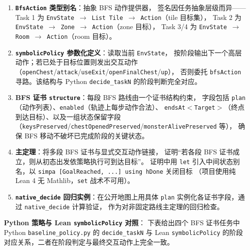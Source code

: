 \documentclass[12pt,a4paper]{ctexart}
\begin{document}
\begin{enumerate}[leftmargin=2em]
  \item \textbf{\texttt{BfsAction} 类型别名}：抽象 BFS 动作提供器，
  签名因任务抽象层级而异——
  Task 1 为 \texttt{EnvState $\to$ List Tile $\to$ Action}（tile 目标集），
  Task 2 为 \texttt{EnvState $\to$ Zone $\to$ Action}（zone 目标），
  Task 3/4 为 \texttt{EnvState $\to$ Room $\to$ Action}（room 目标）。
  \item \textbf{\texttt{symbolicPolicy} 参数化定义}：读取当前 \texttt{EnvState}，
  按阶段输出下一个高层动作；若已处于目标位置则发出交互动作（\texttt{openChest}/\texttt{attack}/\texttt{useExit}/\texttt{openFinalChest}/\texttt{up}），
  否则委托 \texttt{bfsAction} 寻路。该结构与 Python \texttt{decide\_taskN}
  的阶段判断完全对应。
  \item \textbf{BFS 证书 \texttt{structure}}：每段 BFS 路线由一个证书结构约束，
  字段包括 \texttt{plan}（动作列表）、\texttt{enabled}（轨迹上每步动作合法）、
  \texttt{endsAt$<$Target$>$}（终点到达目标）、以及一组状态保留字段
  （\texttt{keysPreserved}/\texttt{chestOpenedPreserved}/\texttt{monsterAlivePreserved} 等），
  确保 BFS 移动不破坏已完成阶段的关键状态。
  \item \textbf{主定理}：将多段 BFS 证书与显式交互动作链接，
  证明“若各段 BFS 证书成立，则从初态出发依策略执行可到达目标”。
  证明中用 \texttt{let} 引入中间状态别名，以
  \texttt{simpa [GoalReached, ...] using hDone} 关闭目标
  （项目使用纯 Lean 4 无 Mathlib，\texttt{set} 战术不可用）。
  \item \textbf{\texttt{native\_decide} 回归实例}：在公开地图上用具体 \texttt{plan}
  实例化各证书字段，通过 \texttt{native\_decide} 计算验证，
  作为对非固定路线主定理的回归检查。
\end{enumerate}

\textbf{Python 策略与 Lean \texttt{symbolicPolicy} 对照}：
下表给出四个 BFS 证书任务中 Python \texttt{baseline\_policy.py} 的 \texttt{decide\_taskN}
与 Lean \texttt{symbolicPolicy} 的阶段对应关系，二者在阶段判定与最终交互动作上完全一致。
\end{document}
